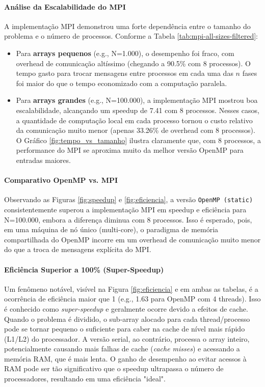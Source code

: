 \documentclass[12pt, a4paper]{article}
\begin{document}
\paragraph{Análise da Escalabilidade do MPI}
A implementação MPI demonstrou uma forte dependência entre o tamanho do problema e o número de processos. Conforme a Tabela \ref{tab:mpi-all-sizes-filtered}:
\begin{itemize}
    \item Para \textbf{arrays pequenos} (e.g., N=1.000), o desempenho foi fraco, com overhead de comunicação altíssimo (chegando a 90.5\% com 8 processos). O tempo gasto para trocar mensagens entre processos em cada uma das $n$ fases foi maior do que o tempo economizado com a computação paralela.
    
    \item Para \textbf{arrays grandes} (e.g., N=100.000), a implementação MPI mostrou boa escalabilidade, alcançando um speedup de 7.41 com 8 processos. Nesses casos, a quantidade de computação local em cada processo tornou o custo relativo da comunicação muito menor (apenas 33.26\% de overhead com 8 processos). O Gráfico \ref{fig:tempo_vs_tamanho} ilustra claramente que, com 8 processos, a performance do MPI se aproxima muito da melhor versão OpenMP para entradas maiores.
\end{itemize}

\paragraph{Comparativo OpenMP vs. MPI}
Observando as Figuras \ref{fig:speedup} e \ref{fig:eficiencia}, a versão \texttt{OpenMP (static)} consistentemente superou a implementação MPI em speedup e eficiência para N=100.000, embora a diferença diminua com 8 processos. Isso é esperado, pois, em uma máquina de nó único (multi-core), o paradigma de memória compartilhada do OpenMP incorre em um overhead de comunicação muito menor do que a troca de mensagens explícita do MPI.

\paragraph{Eficiência Superior a 100\% (Super-Speedup)}
Um fenômeno notável, visível na Figura \ref{fig:eficiencia} e em ambas as tabelas, é a ocorrência de eficiência maior que 1 (e.g., 1.63 para OpenMP com 4 threads). Isso é conhecido como \textit{super-speedup} e geralmente ocorre devido a efeitos de cache. Quando o problema é dividido, o sub-array alocado para cada thread/processo pode se tornar pequeno o suficiente para caber na cache de nível mais rápido (L1/L2) do processador. A versão serial, ao contrário, processa o array inteiro, potencialmente causando mais falhas de cache (\textit{cache misses}) e acessando a memória RAM, que é mais lenta. O ganho de desempenho ao evitar acessos à RAM pode ser tão significativo que o speedup ultrapassa o número de processadores, resultando em uma eficiência "ideal".
\end{document}
